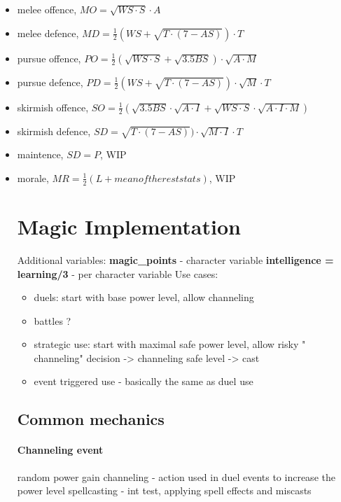 \documentclass[10pt, english]{article}
\begin{document}
\begin{itemize}

\item melee offence, $MO = \sqrt{WS \cdot S }\cdot A $

\item melee defence,
$MD = \frac{1}{2}(WS + \sqrt{T\cdot (7-AS)})\cdot T$

\item pursue offence, 
$PO = \frac{1}{2}(\sqrt{WS \cdot S} + \sqrt{3.5 BS})\cdot \sqrt{A\cdot M}$

\item pursue defence, 
$PD = \frac{1}{2}(WS + \sqrt{T\cdot (7-AS)})\cdot \sqrt{M}\cdot T$

\item skirmish offence, 
$SO = \frac{1}{2} \left( 
\sqrt{3.5BS} \cdot \sqrt{A\cdot I} + 
\sqrt{WS\cdot S} \cdot \sqrt{A\cdot I\cdot M}
\right)$

\item skirmish defence, 
$SD = \sqrt{T\cdot (7-AS)})\cdot \sqrt{M\cdot I}\cdot T$

\item maintence, $SD = P$, WIP
\item morale, $MR = \frac{1}{2} (L + mean of the rest stats)$, WIP


\section{Magic Implementation}
Additional variables:
\textbf{magic\_points} - character variable
\textbf{intelligence = learning/3} - per character variable
Use cases:
\begin{itemize}
\item duels:
start with base power level, allow channeling
\item battles ?
\item strategic use:
start with maximal safe power level, allow risky " channeling" 
 decision -> channeling safe level -> cast
\item event triggered use - basically the same as duel use
\end{itemize}

\subsection{Common mechanics}
\paragraph{Channeling event}
random power gain 
channeling - action used in duel events to increase the power level
spellcasting - int test, applying spell effects and miscasts
\end{itemize}
\end{document}
